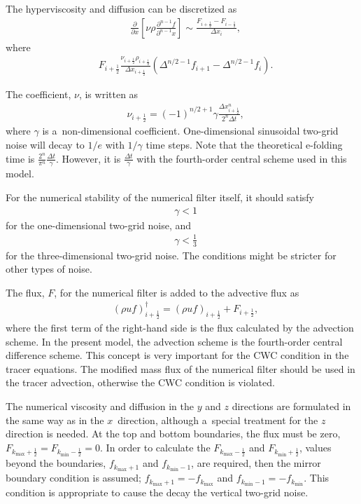The hyperviscosity and diffusion can be discretized as
\begin{align}
&\frac{\partial }{\partial x}\left[\nu \rho \frac{\partial^{n-1} f}{\partial^{n-1} x}\right] \sim
\frac{F_{i+\frac{1}{2}}-F_{i-\frac{1}{2}}}{\Delta x_{i}},
\label{eq:num-diff}
\end{align}
where
\begin{align}
&F_{i+\frac{1}{2}}  \frac{\nu_{i+\frac{1}{2}}\rho_{i+\frac{1}{2}}}{\Delta x_{i+\frac{1}{2}}}
       \left( \Delta^{n/2-1} f_{i+1} - \Delta^{n/2-1} f_i \right).
\label{eq:num-diff-F}
\end{align}

The coefficient, $\nu$, is written as
\begin{align}
&\nu_{i+\frac{1}{2}} = (-1)^{n/2+1} \gamma \frac{\Delta x_{i+\frac{1}{2}}^n}{2^n\Delta t},
\end{align}
where $\gamma$ is a~non-dimensional coefficient.
One-dimensional sinusoidal two-grid noise will decay to $1/e$ with $1/\gamma$ time steps.
Note that the theoretical e-folding time is $\frac{2^n}{\pi^n}\frac{\Delta t}{\gamma}$.
However, it is $\frac{\Delta t}{\gamma}$ with the fourth-order central scheme used in this model.


For the numerical stability of the numerical filter itself, it should satisfy
\begin{align}
&\gamma < 1
\end{align}
for the one-dimensional two-grid noise, and
\begin{align}
&\gamma < \frac{1}{3} \label{eq:condition-gamma}
\end{align}
for the three-dimensional two-grid noise.
The conditions might be stricter for other types of noise.

The flux, $F$, for the numerical filter is added to the advective flux as
\begin{align}
&(\rho u f)_{i+\frac{1}{2}}^{\dagger} = (\rho u f)_{i+\frac{1}{2}}+F_{i+\frac{1}{2}},
\end{align}
where the first term of the right-hand side is the flux calculated by the advection scheme.
In the present model, the advection scheme is the fourth-order central difference scheme.
This concept is very important for the CWC condition in the tracer equations.
The modified mass flux of the numerical filter should be used in the tracer advection, otherwise the CWC condition is violated.

The numerical viscosity and diffusion in the $y$ and $z$ directions are formulated in the same way as in the $x$~direction, although a~special treatment for the $z$ direction is needed.
At the top and bottom boundaries, the flux must be zero, $F_{k_{\max}+\frac{1}{2}} = F_{k_{\min}-\frac{1}{2}} = 0$.
In order to calculate the $F_{k_{\max}-\frac{1}{2}}$ and $F_{k_{\min}+\frac{1}{2}}$, values beyond the boundaries, $f_{k_{\max}+1}$ and $f_{k_{\min}-1}$, are required, then the mirror boundary condition is assumed; $f_{k_{\max}+1} = -f_{k_{\max}}$ and $f_{k_{\min}-1} = -f_{k_{\min}}$.
This condition is appropriate to cause the decay the vertical two-grid noise.


